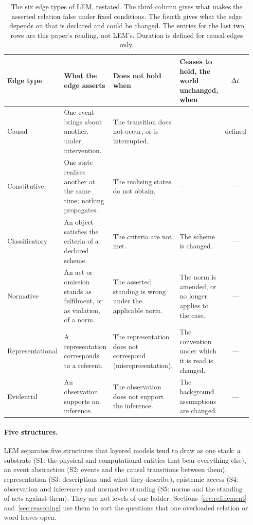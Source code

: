 \begin{table}[t]
\centering\small
\begin{tabularx}{\textwidth}{@{}P{2.7cm}LLP{3.0cm}c@{}}
\toprule
Edge type & What the edge asserts & Does not hold when &
  Ceases to hold, the world unchanged, when & $\Delta t$ \\
\midrule
Causal & One event brings about another, under intervention. &
  The transition does not occur, or is interrupted. & --- & defined \\
Constitutive & One state realises another at the same time; nothing propagates. &
  The realising states do not obtain. & --- & --- \\
Classificatory & An object satisfies the criteria of a declared scheme. &
  The criteria are not met. & The scheme is changed. & --- \\
Normative & An act or omission stands as fulfilment, or as violation, of a norm. &
  The asserted standing is wrong under the applicable norm. &
  The norm is amended, or no longer applies to the case. & --- \\
Representational & A representation corresponds to a referent. &
  The representation does not correspond (misrepresentation). &
  The convention under which it is read is changed. & --- \\
Evidential & An observation supports an inference. &
  The observation does not support the inference. &
  The background assumptions are changed. & --- \\
\bottomrule
\end{tabularx}
\caption{The six edge types of LEM, restated. The third column gives what makes the
asserted relation false under fixed conditions. The fourth gives what the edge depends
on that is declared and could be changed. The entries for the last two rows are this
paper's reading, not LEM's. Duration is defined for causal edges only.}
\label{tab:edges}
\end{table}

\paragraph{Five structures.} LEM separates five structures that layered models tend to
draw as one stack: a substrate (S1: the physical and computational entities that bear
everything else), an event abstraction (S2: events and the causal transitions between
them), representation (S3: descriptions and what they describe), epistemic access (S4:
observation and inference) and normative standing (S5: norms and the standing of acts
against them). They are not levels of one ladder. Sections~\ref{sec:refinement}
and~\ref{sec:reasoning} use them to sort the questions that one overloaded relation or
word leaves open.

